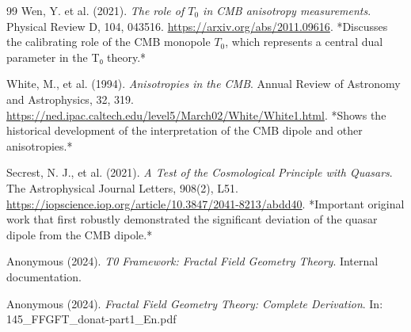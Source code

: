 \begin{thebibliography}{99}
		Wen, Y. et al. (2021). \textit{The role of \(T_0\) in CMB anisotropy measurements}. 
		Physical Review D, 104, 043516.
		\href{https://arxiv.org/abs/2011.09616}{https://arxiv.org/abs/2011.09616}.
		*Discusses the calibrating role of the CMB monopole \(T_0\), which represents a central dual parameter in the T₀ theory.*
		
		White, M., et al. (1994). \textit{Anisotropies in the CMB}. 
		Annual Review of Astronomy and Astrophysics, 32, 319.
		\href{https://ned.ipac.caltech.edu/level5/March02/White/White1.html}{https://ned.ipac.caltech.edu/level5/March02/White/White1.html}.
		*Shows the historical development of the interpretation of the CMB dipole and other anisotropies.*
		
		Secrest, N. J., et al. (2021). \textit{A Test of the Cosmological Principle with Quasars}. 
		The Astrophysical Journal Letters, 908(2), L51.
		\href{https://iopscience.iop.org/article/10.3847/2041-8213/abdd40}{https://iopscience.iop.org/article/10.3847/2041-8213/abdd40}.
		*Important original work that first robustly demonstrated the significant deviation of the quasar dipole from the CMB dipole.*
		
		Anonymous (2024). \textit{T0 Framework: Fractal Field Geometry Theory}. 
		Internal documentation.
		
		Anonymous (2024). \textit{Fractal Field Geometry Theory: Complete Derivation}. 
		In: 145\_FFGFT\_donat-part1\_En.pdf
		
	\end{thebibliography}
	